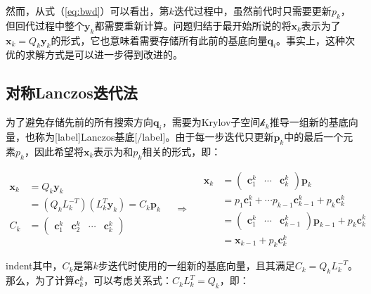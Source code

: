\documentclass[UTF8,nofonts]{ctexart}
\begin{document}
然而，从式（\ref{eq:bwd}）可以看出，第$k$迭代过程中，虽然前代时只需要更新$p_k$，但回代过程中整个$\boldsymbol{y}_k$都需要重新计算。问题归结于最开始所说的将$\boldsymbol{x}_k$表示为了$\boldsymbol{x}_k=Q_k\boldsymbol{y}_k$的形式，它也意味着需要存储所有此前的基底向量$\boldsymbol{q}_i$。事实上，这种次优的求解方式是可以进一步得到改进的。

\subsection*{对称Lanczos迭代法}

为了避免存储先前的所有搜索方向$\boldsymbol{q}_i$，需要为Krylov子空间$\mathcal{k}_k$推导一组新的基底向量，也称为[label]Lanczos基底[/label]。由于每一步迭代只更新$\boldsymbol{p}_k$中的最后一个元素$p_k$，因此希望将$\boldsymbol{x}_k$表示为和$p_k$相关的形式，即：

\begin{equation}
	\label{eq:xkckpk}
	\begin{aligned}
		\boldsymbol{x}_k &= Q_k\boldsymbol{y}_k \\
		&= (Q_kL_k^{-T})(L_k^T\boldsymbol{y}_k)
		= C_k\boldsymbol{p}_k \\
		C_k &=
		\begin{pmatrix}
			\boldsymbol{c}^k_1 & \boldsymbol{c}^k_2 & \cdots & \boldsymbol{c}^k_k
		\end{pmatrix}
	\end{aligned} \quad\Longrightarrow\quad
	\begin{aligned}
		\boldsymbol{x}_k &=
		\begin{pmatrix}
			\boldsymbol{c}^k_1 & \cdots & \boldsymbol{c}^k_k
		\end{pmatrix}\boldsymbol{p}_k \\
		&= p_1\boldsymbol{c}_1^k + \cdots p_{k-1}\boldsymbol{c}_{k-1}^k + p_k\boldsymbol{c}_k^k \\
		&= \begin{pmatrix}
			\boldsymbol{c}^k_1 & \cdots & \boldsymbol{c}^k_{k-1}
		\end{pmatrix}\boldsymbol{p}_{k-1}+p_k\boldsymbol{c}_k^k \\
		&= \boldsymbol{x}_{k-1}+p_k\boldsymbol{c}_k^k
	\end{aligned}
\end{equation}

indent其中，$C_k$是第$k$步迭代时使用的一组新的基底向量，且其满足$C_k=Q_kL_k^{-T}$。那么，为了计算$\boldsymbol{c}_k^k$，可以考虑关系式：$C_kL_k^T=Q_k$，即：
\end{document}
